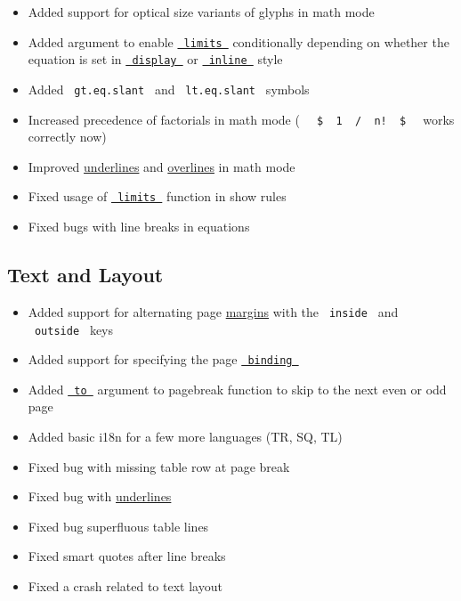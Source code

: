 \begin{itemize}
\tightlist
\item
  Added support for optical size variants of glyphs in math mode
\item
  Added argument to enable
  \href{/docs/reference/math/attach/\#functions-limits}{\texttt{\ limits\ }}
  conditionally depending on whether the equation is set in
  \href{/docs/reference/math/sizes/\#functions-display}{\texttt{\ display\ }}
  or
  \href{/docs/reference/math/sizes/\#functions-inline}{\texttt{\ inline\ }}
  style
\item
  Added \texttt{\ gt.eq.slant\ } and \texttt{\ lt.eq.slant\ } symbols
\item
  Increased precedence of factorials in math mode (
  \texttt{\ }{\texttt{\ \$\ }}\texttt{\ 1\ }{\texttt{\ /\ }}\texttt{\ n!\ }{\texttt{\ \$\ }}\texttt{\ }
  works correctly now)
\item
  Improved
  \href{/docs/reference/math/underover/\#functions-underline}{underlines}
  and
  \href{/docs/reference/math/underover/\#functions-overline}{overlines}
  in math mode
\item
  Fixed usage of
  \href{/docs/reference/math/attach/\#functions-limits}{\texttt{\ limits\ }}
  function in show rules
\item
  Fixed bugs with line breaks in equations
\end{itemize}

\subsection{Text and Layout}\label{text-and-layout}

\begin{itemize}
\tightlist
\item
  Added support for alternating page
  \href{/docs/reference/layout/page/\#parameters-margin}{margins} with
  the \texttt{\ inside\ } and \texttt{\ outside\ } keys
\item
  Added support for specifying the page
  \href{/docs/reference/layout/page/\#parameters-binding}{\texttt{\ binding\ }}
\item
  Added
  \href{/docs/reference/layout/pagebreak/\#parameters-to}{\texttt{\ to\ }}
  argument to pagebreak function to skip to the next even or odd page
\item
  Added basic i18n for a few more languages (TR, SQ, TL)
\item
  Fixed bug with missing table row at page break
\item
  Fixed bug with \href{/docs/reference/text/underline/}{underlines}
\item
  Fixed bug superfluous table lines
\item
  Fixed smart quotes after line breaks
\item
  Fixed a crash related to text layout
\end{itemize}

